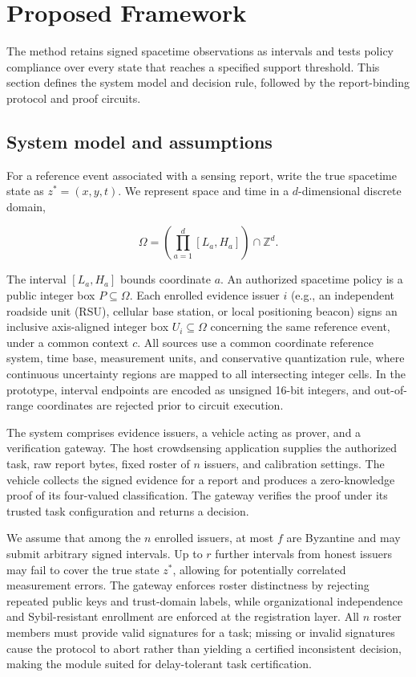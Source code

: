 \section{Proposed Framework}
The method retains signed spacetime observations as intervals and tests policy compliance over every state that reaches a specified support threshold. This section defines the system model and decision rule, followed by the report-binding protocol and proof circuits.

\subsection{System model and assumptions}
For a reference event associated with a sensing report, write the true spacetime state as $z^* = (x, y, t)$. We represent space and time in a $d$-dimensional discrete domain,


\begin{equation}\label{eq:domain}
\Omega = \left(\prod_{a=1}^{d} [L_a, H_a]\right) \cap \mathbb{Z}^d.
\end{equation}


The interval $[L_a, H_a]$ bounds coordinate $a$. An authorized spacetime policy is a public integer box $P \subseteq \Omega$. Each enrolled evidence issuer $i$ (e.g., an independent roadside unit (RSU), cellular base station, or local positioning beacon) signs an inclusive axis-aligned integer box $U_i \subseteq \Omega$ concerning the same reference event, under a common context $c$. All sources use a common coordinate reference system, time base, measurement units, and conservative quantization rule, where continuous uncertainty regions are mapped to all intersecting integer cells. In the prototype, interval endpoints are encoded as unsigned 16-bit integers, and out-of-range coordinates are rejected prior to circuit execution.

The system comprises evidence issuers, a vehicle acting as prover, and a verification gateway. The host crowdsensing application supplies the authorized task, raw report bytes, fixed roster of $n$ issuers, and calibration settings. The vehicle collects the signed evidence for a report and produces a zero-knowledge proof of its four-valued classification. The gateway verifies the proof under its trusted task configuration and returns a decision.

We assume that among the $n$ enrolled issuers, at most $f$ are Byzantine and may submit arbitrary signed intervals. Up to $r$ further intervals from honest issuers may fail to cover the true state $z^*$, allowing for potentially correlated measurement errors. The gateway enforces roster distinctness by rejecting repeated public keys and trust-domain labels, while organizational independence and Sybil-resistant enrollment are enforced at the registration layer. All $n$ roster members must provide valid signatures for a task; missing or invalid signatures cause the protocol to abort rather than yielding a certified inconsistent decision, making the module suited for delay-tolerant task certification.

